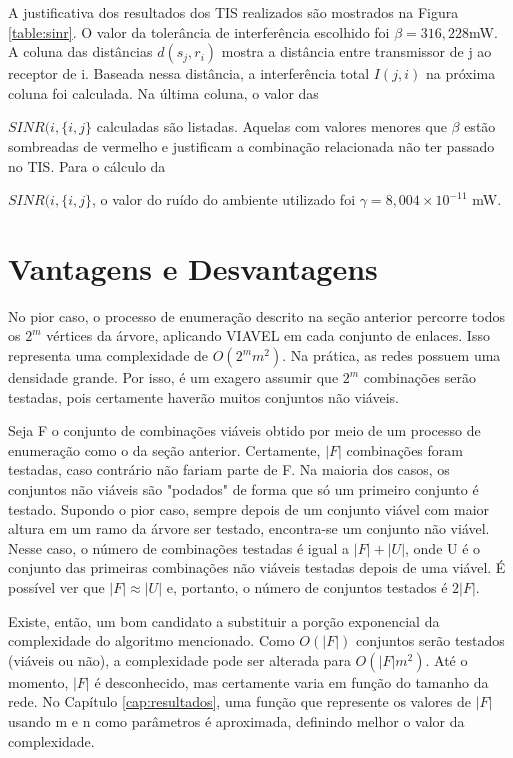 A justificativa dos resultados dos TIS realizados são mostrados na Figura \ref{table:sinr}. O valor da tolerância de interferência escolhido foi $\beta=316,228$mW. A coluna das distâncias $d(s_j,r_i)$ mostra a distância entre transmissor de j ao receptor de i. Baseada nessa distância, a interferência total $I(j,i)$ na próxima coluna foi calculada. Na última coluna, o valor das {$SINR(i, \{i,j\}$  calculadas são listadas. Aquelas com valores menores que $\beta$ estão sombreadas de vermelho e justificam a combinação relacionada não ter passado no TIS. Para o cálculo da {$SINR(i, \{i,j\}$, o valor do ruído do ambiente utilizado foi $\gamma=8,004 \times 10^{-11}$ mW.


\section{Vantagens e Desvantagens}

No pior caso, o processo de enumeração descrito na seção anterior percorre todos os $2^m$ vértices da árvore, aplicando VIAVEL em cada conjunto de enlaces. Isso representa uma complexidade de $O(2^mm^2)$. Na prática, as redes possuem uma densidade grande. Por isso, é um exagero assumir que $2^m$ combinações serão testadas, pois certamente haverão muitos conjuntos não viáveis. 

Seja F o conjunto de combinações viáveis obtido por meio de um processo de enumeração como o da seção anterior. Certamente, $|F|$ combinações foram testadas, caso contrário não fariam parte de F. Na maioria dos casos, os conjuntos não viáveis são "podados" de forma que só um primeiro conjunto é testado. Supondo o pior caso, sempre depois de um conjunto viável com maior altura em um ramo da árvore ser testado, encontra-se um conjunto não viável. Nesse caso, o número de combinações testadas é igual a $|F| + |U|$, onde U é o conjunto das primeiras combinações não viáveis testadas depois de uma viável. É possível ver que $|F| \approx |U|$ e, portanto, o número de conjuntos testados é $2|F|$. 

Existe, então, um bom candidato a substituir a porção exponencial da complexidade do algoritmo mencionado. Como $O(|F|)$ conjuntos serão testados (viáveis ou não), a complexidade pode ser alterada para $O(|F|m^2)$. Até o momento, $|F|$ é desconhecido, mas certamente varia em função do tamanho da rede. No Capítulo \ref{cap:resultados}, uma função que represente os valores de $|F|$ usando m e n como parâmetros é aproximada, definindo melhor o valor da complexidade.

}}
